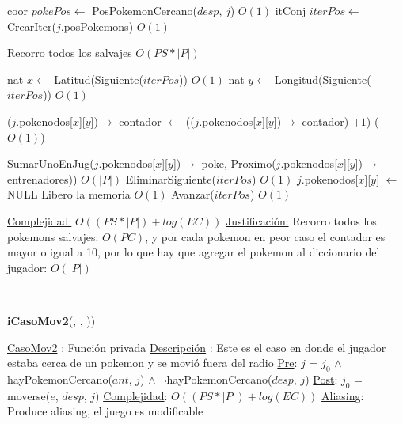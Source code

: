 \begin{Algoritmos}
\begin{algorithmic}[1]
$ $\newline

\State coor $pokePos \gets$ PosPokemonCercano($desp$, $j$) \Comment $O(1)$
\State itConj $iterPos \gets$ CrearIter($j$.posPokemons) \Comment $O(1)$ 

 Recorro todos los salvajes \Comment $O(PS * |P|)$

	\State nat $x \gets$ Latitud(Siguiente($iterPos$)) \Comment $O(1)$
	\State nat $y \gets$ Longitud(Siguiente($iterPos$)) \Comment $O(1)$		
	
		\State ($j$.pokenodos[$x$][$y$])$\rightarrow$ contador $\gets$ (($j$.pokenodos[$x$][$y$])$\rightarrow$ contador) $+ 1$) \Comment($O(1)$)
	\EndIf
	
		\State SumarUnoEnJug($j$.pokenodos[$x$][$y$])$\rightarrow$ poke, Proximo($j$.pokenodos[$x$][$y$])$\rightarrow$ entrenadores)) \Comment $O(|P|)$
		\State EliminarSiguiente($iterPos$) \Comment $O(1)$
		\State $j$.pokenodos[$x$][$y$] $\gets$ NULL \Comment Libero la memoria $O(1)$
	\Else 
		\State Avanzar($iterPos$)	\Comment $O(1)$	
	\EndIf

\EndWhile 

\medskip
\Statex \underline{Complejidad:} $O((PS *|P|) + log(EC))$ 
\Statex \underline{Justificaci\'on:} Recorro todos los pokemons salvajes: $O(PC)$, y por cada pokemon en peor caso el contador es mayor o igual a 10, por lo que hay que agregar el pokemon al diccionario del jugador: $O(|P|)$
\end{algorithmic}

$ $\newline
$ $\newline


{\textbf{iCasoMov2}(,  , ))}
\begin{algorithmic}[1]

\Statex \underline{CasoMov2} : Funci\'on privada 
\Statex \underline{Descripci\'on} : Este es el caso en donde el jugador estaba cerca de un pokemon y se movi\'o fuera del radio
\Statex \underline{Pre}: $j$ = $j_0$ $\land$ hayPokemonCercano($ant$, $j$) $\land$ $\neg$hayPokemonCercano($desp$, $j$) 
\Statex \underline{Post}: $j_0$ = moverse($e$, $desp$, $j$) 
\Statex \underline{Complejidad}:  $O((PS *|P|) + log(EC))$ 
\Statex \underline{Aliasing}: Produce aliasing, el juego es modificable


\end{algorithmic}
\end{Algoritmos}
